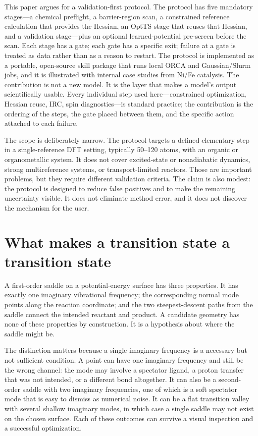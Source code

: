 \documentclass[11pt,a4paper]{article}
\begin{document}
This paper argues for a validation-first protocol. The protocol has five mandatory stages---a chemical preflight, a barrier-region scan, a constrained reference calculation that provides the Hessian, an OptTS stage that reuses that Hessian, and a validation stage---plus an optional learned-potential pre-screen before the scan. Each stage has a gate; each gate has a specific exit; failure at a gate is treated as data rather than as a reason to restart. The protocol is implemented as a portable, open-source skill package that runs local ORCA and Gaussian/Slurm jobs, and it is illustrated with internal case studies from Ni/Fe catalysis. The contribution is not a new model. It is the layer that makes a model's output scientifically usable. Every individual step used here---constrained optimization, Hessian reuse, IRC, spin diagnostics---is standard practice; the contribution is the ordering of the steps, the gate placed between them, and the specific action attached to each failure.

The scope is deliberately narrow. The protocol targets a defined elementary step in a single-reference DFT setting, typically 50--120 atoms, with an organic or organometallic system. It does not cover excited-state or nonadiabatic dynamics, strong multireference systems, or transport-limited reactors. Those are important problems, but they require different validation criteria. The claim is also modest: the protocol is designed to reduce false positives and to make the remaining uncertainty visible. It does not eliminate method error, and it does not discover the mechanism for the user.

\section{What makes a transition state a transition state}

A first-order saddle on a potential-energy surface has three properties. It has exactly one imaginary vibrational frequency; the corresponding normal mode points along the reaction coordinate; and the two steepest-descent paths from the saddle connect the intended reactant and product. A candidate geometry has none of these properties by construction. It is a hypothesis about where the saddle might be.

The distinction matters because a single imaginary frequency is a necessary but not sufficient condition. A point can have one imaginary frequency and still be the wrong channel: the mode may involve a spectator ligand, a proton transfer that was not intended, or a different bond altogether. It can also be a second-order saddle with two imaginary frequencies, one of which is a soft spectator mode that is easy to dismiss as numerical noise. It can be a flat transition valley with several shallow imaginary modes, in which case a single saddle may not exist on the chosen surface. Each of these outcomes can survive a visual inspection and a successful optimization.
\end{document}
